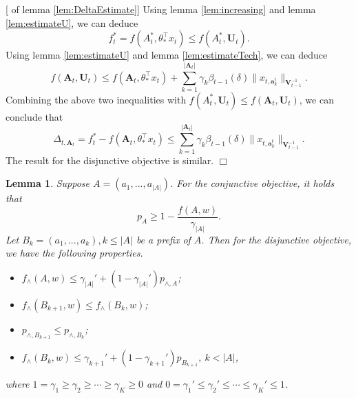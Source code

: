 \documentclass{article}
\newcommand{\bA}{\mathbf{A}}
\newcommand{\ba}{\mathbf{a}}
\newcommand{\bU}{\mathbf{U}}
\newcommand{\bV}{\mathbf{V}}
\newcommand{\abs}[1]{\left| #1 \right|}
\newcommand{\norm}[1]{\| #1 \|}
\newtheorem{lemma}[theorem]{Lemma}%
\newenvironment{proof}{\noindent {\textbf{Proof. }}}{$\Box$ \medskip}
\begin{document}
\begin{proof}[ of lemma \ref{lem:DeltaEstimate}]
Using lemma \ref{lem:increasing} and lemma \ref{lem:estimateU}, we can deduce 
$$
f_t^{\ast} = f(A_t^{\ast}, \theta_{\ast}^{\top}x_t) \leq f(A_t^{\ast}, \bU_t).
$$
Using lemma \ref{lem:estimateU} and lemma \ref{lem:estimateTech}, we can deduce
$$
f(\bA_t, \bU_t) \leq f(\bA_t, \theta_{\ast}^{\top}x_t) + \sum_{k=1}^{\abs{\bA_t}} \gamma_k \beta_{t-1}(\delta)\norm{x_{t, \ba_k^t}}_{\bV_{t-1}^{-1}}.
$$
Combining the above two inequalities with $f(A_t^{\ast}, \bU_t) \leq f(\bA_t, \bU_t)$, we can conclude that
$$
\Delta_{t, \bA_t} = f_t^{\ast} - f(\bA_t, \theta_{\ast}^{\top}x_t) \leq \sum_{k=1}^{\abs{\bA_t}} \gamma_k \beta_{t-1}(\delta)\norm{x_{t, \ba_k^t}}_{\bV_{t-1}^{-1}}.
$$
The result for the disjunctive objective is similar.
\end{proof}

\begin{lemma}
\label{lem:prefixRelation}
Suppose $A = (a_1, ..., a_{\abs{A}})$. For the conjunctive objective, it holds that
$$
p_A \geq 1 - \frac{f(A, w)}{\gamma_{\abs{A}}}.
$$
Let $B_k = (a_1, ..., a_k), k \leq \abs{A}$ be a prefix of $A$. Then for the disjunctive objective, we have the following properties.
\begin{itemize}
\item[(1)] $f_{\wedge}(A, w) \leq \gamma_{\abs{A}}' + (1 - \gamma_{\abs{A}}') p_{\wedge, A}$;
\item[(2)] $f_{\wedge}(B_{k+1}, w) \leq f_{\wedge}(B_k, w)$;
\item[(3)] $p_{\wedge, B_{k+1}} \leq p_{\wedge, B_k}$;
\item[(4)] $f_{\wedge}(B_k, w) \leq \gamma_{k+1}' + (1 - \gamma_{k+1}') p_{B_{k+1}}, ~k < \abs{A}$,
\end{itemize}
where $1 = \gamma_1 \geq \gamma_2 \geq \cdots \geq \gamma_K \geq 0$ and $0 = \gamma_1' \leq \gamma_2' \leq \cdots \leq \gamma_K' \leq 1$.
\end{lemma}
\end{document}
